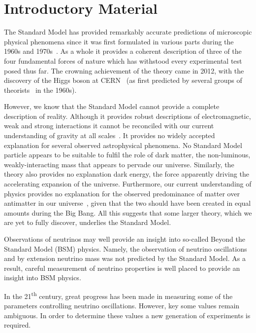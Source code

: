 \chapter{Introductory Material}
\label{sec:intro}

The Standard Model has provided remarkably accurate predictions of microscopic physical phenomena since it was first formulated in various parts during the 1960s and 1970s~\cite{glashow1961, weinberg1967, qcdTheory1, qcdTheory2}.
As a whole it provides a coherent description of three of the four fundamental forces of nature which has withstood every experimental test posed thus far. 
The crowning achievement of the theory came in 2012, with the discovery of the Higgs boson at CERN~\cite{higgsDiscoveryATLAS, higgsDiscoveryCMS} (as first predicted by several groups of theorists~\cite{higgsTheory1, higgsTheory2, higgsTheory3} in the 1960s).

However, we know that the Standard Model cannot provide a complete description of reality.
Although it provides robust descriptions of electromagnetic, weak and strong interactions it cannot be reconciled with our current understanding of gravity at all scales~\cite{quantumGravity}.
It provides no widely accepted explanation for several observed astrophysical phenomena.
No Standard Model particle appears to be suitable to fulfil the role of dark matter, the non-luminous, weakly-interacting mass that appears to pervade our universe.
Similarly, the theory also provides no explanation dark energy, the force apparently driving the accelerating expansion of the universe.
Furthermore, our current understanding of physics provides no explanation for the observed predominance of matter over antimatter in our universe~\cite{matterAntimatterAMS}, given that the two should have been created in equal amounts during the Big Bang.
All this suggests that some larger theory, which we are yet to fully discover, underlies the Standard Model.

Observations of neutrinos may well provide an insight into so-called Beyond the Standard Model (BSM) physics.
Namely, the observation of neutrino oscillations~\cite{SNO, superK} and by extension neutrino mass was not predicted by the Standard Model.
As a result, careful measurement of neutrino properties is well placed to provide an insight into BSM physics.

In the 21\textsuperscript{th} century, great progress has been made in measuring some of the parameters controlling neutrino oscillations.
However, key some values remain ambiguous.
In order to determine these values a new generation of experiments is required.

